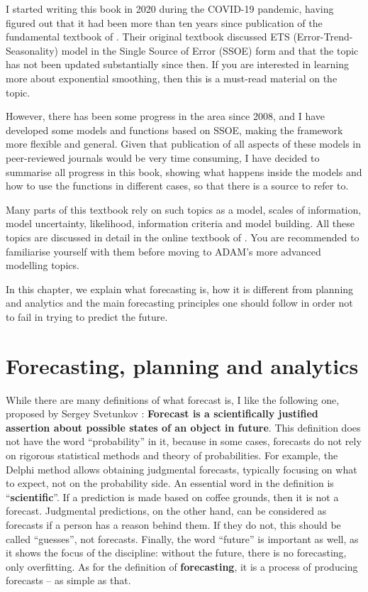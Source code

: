 \documentclass[
]{book}
\theoremstyle{definition}
\theoremstyle{definition}
\theoremstyle{definition}
\theoremstyle{definition}
\theoremstyle{remark}
\begin{document}
I started writing this book in 2020 during the COVID-19 pandemic, having figured out that it had been more than ten years since publication of the fundamental textbook of \citet{Hyndman2008b}. Their original textbook discussed ETS (Error-Trend-Seasonality) model in the Single Source of Error (SSOE) form and that the topic has not been updated substantially since then. If you are interested in learning more about exponential smoothing, then this is a must-read material on the topic.

However, there has been some progress in the area since 2008, and I have developed some models and functions based on SSOE, making the framework more flexible and general. Given that publication of all aspects of these models in peer-reviewed journals would be very time consuming, I have decided to summarise all progress in this book, showing what happens inside the models and how to use the functions in different cases, so that there is a source to refer to.

Many parts of this textbook rely on such topics as a model, scales of information, model uncertainty, likelihood, information criteria and model building. All these topics are discussed in detail in the online textbook of \citet{SvetunkovSBA}. You are recommended to familiarise yourself with them before moving to ADAM's more advanced modelling topics.

In this chapter, we explain what forecasting is, how it is different from planning and analytics and the main forecasting principles one should follow in order not to fail in trying to predict the future.

\hypertarget{forecastingPlanningAnalytics}{%
\section{Forecasting, planning and analytics}\label{forecastingPlanningAnalytics}}

While there are many definitions of what forecast is, I like the following one, proposed by Sergey Svetunkov \citep{Svetunkov2014Textbook}: \textbf{Forecast is a scientifically justified assertion about possible states of an object in future}. This definition does not have the word ``probability'' in it, because in some cases, forecasts do not rely on rigorous statistical methods and theory of probabilities. For example, the Delphi method allows obtaining judgmental forecasts, typically focusing on what to expect, not on the probability side. An essential word in the definition is ``\textbf{scientific}''. If a prediction is made based on coffee grounds, then it is not a forecast. Judgmental predictions, on the other hand, can be considered as forecasts if a person has a reason behind them. If they do not, this should be called ``guesses'', not forecasts. Finally, the word ``future'' is important as well, as it shows the focus of the discipline: without the future, there is no forecasting, only overfitting. As for the definition of \textbf{forecasting}, it is a process of producing forecasts -- as simple as that.
\end{document}
